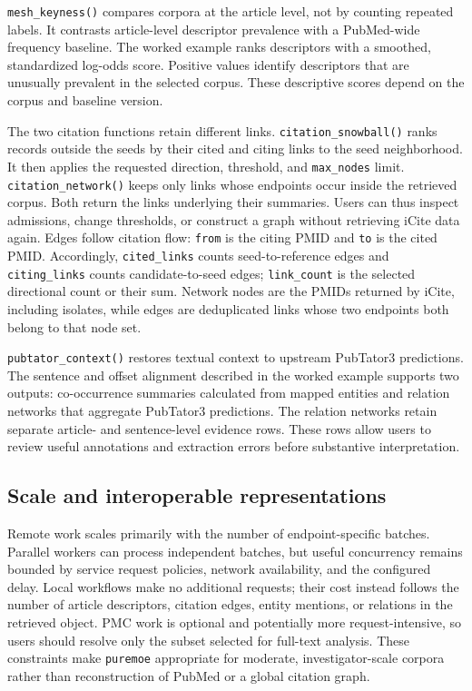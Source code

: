 \texttt{mesh\_keyness()} compares corpora at the article level, not by counting repeated
labels. It contrasts article-level descriptor prevalence with a PubMed-wide
frequency baseline. The worked example ranks descriptors with a smoothed,
standardized log-odds score. Positive values identify descriptors that are
unusually prevalent in the selected corpus. These descriptive scores depend on
the corpus and baseline version.

The two citation functions retain different links. \texttt{citation\_snowball()} ranks
records outside the seeds by their cited and citing links to the seed
neighborhood. It then applies the requested direction, threshold, and
\texttt{max\_nodes} limit. \texttt{citation\_network()} keeps only links whose endpoints occur
inside the retrieved corpus. Both return the links underlying their summaries.
Users can thus inspect admissions, change thresholds, or construct a graph
without retrieving iCite data again.
Edges follow citation flow: \texttt{from} is the citing PMID and \texttt{to} is the cited
PMID. Accordingly, \texttt{cited\_links} counts seed-to-reference edges and
\texttt{citing\_links} counts candidate-to-seed edges; \texttt{link\_count} is the selected
directional count or their sum. Network nodes are the PMIDs returned by iCite,
including isolates, while edges are deduplicated links whose two endpoints both
belong to that node set.

\texttt{pubtator\_context()} restores textual context to upstream PubTator3 predictions.
The sentence and offset alignment described in the worked example supports two
outputs: co-occurrence summaries calculated from mapped entities and relation
networks that aggregate PubTator3 predictions. The relation networks retain
separate article- and sentence-level evidence rows. These rows allow users to
review useful annotations and extraction errors before substantive
interpretation.

\subsection{Scale and interoperable representations}\label{scale-and-interoperable-representations}

Remote work scales primarily with the number of endpoint-specific batches.
Parallel workers can process independent batches, but useful concurrency remains
bounded by service request policies, network availability, and the configured
delay. Local workflows make no additional requests; their cost instead follows
the number of article descriptors, citation edges, entity mentions, or relations
in the retrieved object. PMC work is optional and potentially more
request-intensive, so users should resolve only the subset selected for
full-text analysis. These constraints make \texttt{puremoe} appropriate for moderate,
investigator-scale corpora rather than reconstruction of PubMed or a global
citation graph.

